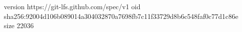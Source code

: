 version https://git-lfs.github.com/spec/v1
oid sha256:92004d106b089014a304032870a7698fb7c11f33729d8b6c548faf0c77d1c86e
size 22036
